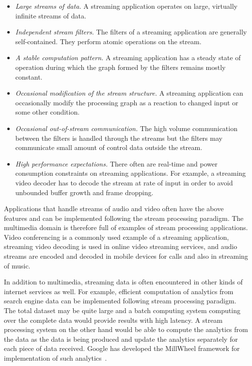 \begin{itemize}
    \item \textit{Large streams of data.} A streaming application operates on large, virtually infinite streams of data.
    \item \textit{Independent stream filters.} The filters of a streaming application are generally self-contained. They perform atomic operations on the stream.
    \item \textit{A stable computation pattern.} A streaming application has a steady state of operation during which the graph formed by the filters remains mostly constant.
    \item \textit{Occasional modification of the stream structure.} A streaming application can occasionally modify the processing graph as a reaction to changed input or some other condition.
    \item \textit{Occasional out-of-stream communication.} The high volume communication between the filters is handled through the streams but the filters may communicate small amount of control data outside the stream.
    \item \textit{High performance expectations.} There often are real-time and power consumption constraints on streaming applications. For example, a streaming video decoder has to decode the stream at rate of input in order to avoid unbounded buffer growth and frame dropping.
\end{itemize}

Applications that handle streams of audio and video often have the above features and can be implemented following the stream processing paradigm. The multimedia domain is therefore full of examples of stream processing applications. Video conferencing is a commonly used example of a streaming application, streaming video decoding is used in online video streaming services, and audio streams are encoded and decoded in mobile devices for calls and also in streaming of music.

In addition to multimedia, streaming data is often encountered in other kinds of internet services as well. For example, efficient computation of analytics from search engine data can be implemented following stream processing paradigm. The total dataset may be quite large and a batch computing system computing over the complete data would provide results with high latency. A stream processing system on the other hand would be able to compute the analytics from the data as the data is being produced and update the analytics separately for each piece of data received. Google has developed the MillWheel framework for implementation of such analytics~\cite{tyler2013millwheel}.

